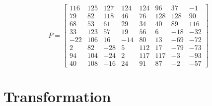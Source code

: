 \documentclass[11pt]{article}
\begin{document}
\begin{equation}
  \label{eqn:centered}
  P = \begin{bmatrix}
    116 & 125 & 127 & 124 & 124 &  96 &  37 &  -1 \\
    79  & 82  & 118 & 46  & 76  & 128 & 128 & 90  \\
    68  & 53  & 61  & 29  & 34  & 40  & 89  & 116 \\
    33  & 123 & 57  & 19  & 56  & 6   & -18 & -32 \\
    -22 & 106 & 16  & -14 & 80  & 13  & -69 & -72 \\
    2   & 82  & -28 & 5   & 112 & 17  & -79 & -73 \\
    94  & 104 & -24 & 2   & 117 & 117 & -3  & -93 \\
    40  & 108 & -16 & 24  & 91  & 87  & -2  & -57
  \end{bmatrix}
\end{equation}

\section{Transformation}
\label{sec: transofrmation}
\end{document}
